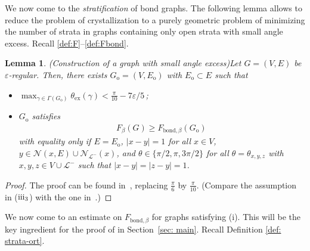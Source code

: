 \documentclass[reqno]{amsart}
\theoremstyle{plain}
\newtheorem{lemma}[theorem]{Lemma}
\theoremstyle{definition}
\numberwithin{equation}{section}
\begin{document}


 We now come to the \textit{stratification} of bond graphs. The following lemma   allows to reduce the problem of crystallization to a purely geometric problem of minimizing the number of strata in graphs containing only open strata  with small angle excess.  Recall \eqref{def:F}--\eqref{def:Fbond}.

\begin{lemma}(Construction of a graph with small angle excess)\label{lemma:construction} Let $ G=(V,E)$ be $\varepsilon$-regular. Then, there exists $G_\mathrm{o}= (V,E_\mathrm{o})$ with $ E_\mathrm{o} \subset E$ such that
\begin{itemize}
\item[\rm (i)] $\max_{\gamma \in \Gamma(G_\mathrm{o})} \theta_{\mathrm{ex}}(\gamma) < \frac{\pi}{10}-7\varepsilon/5$\,;
\item[\rm (ii)]  $G_{\mathrm{o}}$ satisfies
\begin{align*}
 F_\beta (G) \geq   F_{\mathrm{bond},\beta} (  G_{\mathrm{o}})   \,
\end{align*}
with equality only if $E = E_\mathrm{o}$,  $|x-y|=1$ for all $x \in V$, $y\in \mathcal{N}(x,E)\cup \mathcal{N}_{\mathcal{L}^-}(x)$,  and $\theta \in \{\pi/2,\pi,3\pi/2\}$ for all $\theta=\theta_{x,y,z}$ with $x,y,z \in V \cup \mathcal{L}^-$ such that $|x-y|=|z-y|=1$.
\end{itemize}
\end{lemma} 
\begin{proof}
The  proof can be found in~\cite[Proof of Lemma 3.7]{FriedrichKreutz}, replacing $\frac{\pi}{6}$ by $\frac{\pi}{10}$. (Compare the assumption in ($\rm iii_3$)  with the one in~\cite{FriedrichKreutz}.)
\end{proof}

 We now come to an estimate on $ F_{\mathrm{bond},\beta}$ for graphs satisfying (i). This will be the key ingredient for the proof of  in Section~\ref{sec: main}.  Recall Definition \ref{def: strata-ort}.
\end{document}
